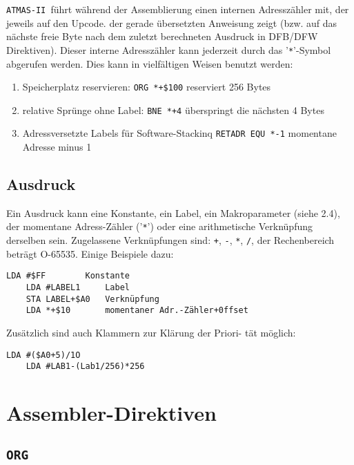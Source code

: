 \documentclass[10pt,a4paper,twoside,final,openright,titlepage]{memoir}
\def\atmas{\texttt{AT\-MAS-II }}
\begin{document}
\atmas führt während der Assemblierung einen
internen Adresszähler mit, der jeweils auf den Upcode.
der gerade übersetzten Anweisung zeigt (bzw. auf das
nächste freie Byte nach dem zuletzt berechneten
Ausdruck in DFB/DFW Direktiven). Dieser interne
Adresszähler kann jederzeit durch das '\texttt{*}'-Symbol
abgerufen werden. Dies kann in vielfältigen Weisen
benutzt werden:

\begin{enumerate}[a]
\item Speicherplatz reservieren:
	\texttt{ORG *+\$100} reserviert 256 Bytes
\item relative Sprünge ohne Label:
	\texttt{BNE *+4} überspringt die nächsten 4 Bytes
\item Adressversetzte Labels für Software-Stackinq
	\texttt{RETADR EQU *-1} momentane Adresse minus 1
\end{enumerate}

\subsection{Ausdruck}

Ein Ausdruck kann eine Konstante, ein Label, ein
Makroparameter (siehe 2.4), der momentane Adress-Zähler ('\texttt{*}') oder eine arithmetische Verknüpfung
derselben sein. Zugelassene Verknüpfungen sind: \texttt{+}, \texttt{-},
\texttt{*}, \texttt{/}, der Rechenbereich beträgt O-65535. Einige
Beispiele dazu:

\begin{Verbatim}[samepage=true]
	LDA #$FF        Konstante
	LDA #LABEL1     Label
	STA LABEL+$A0   Verknüpfung
	LDA *+$10       momentaner Adr.-Zähler+0ffset
\end{Verbatim}

Zusätzlich sind auch Klammern zur Klärung der Priori-
tät möglich:

\begin{Verbatim}[samepage=true]
	LDA #($A0+5)/1O
	LDA #LAB1-(Lab1/256)*256
\end{Verbatim}

\section{Assembler-Direktiven}

\subsection{\texttt{ORG}}
\end{document}
